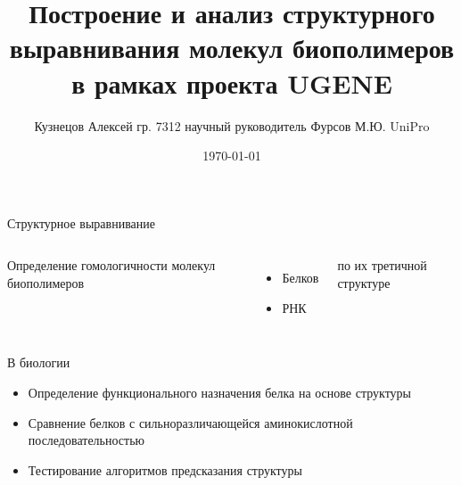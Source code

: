 \documentclass[utf8]{beamer}
\title[Построение структурного выравнивания]{Построение и анализ структурного выравнивания молекул биополимеров в рамках проекта UGENE}
\author[Кузнецов Алексей]{Кузнецов Алексей гр. 7312 \linebreak научный руководитель Фурсов М.Ю. UniPro}
\institute{Новосибирский Государственный Университет}
\date{\today}
\begin{document}

\begin{frame}
\titlepage
\end{frame}

\begin{frame}{Структурное выравнивание}
\begin{columns}[c]
	Определение гомологичности молекул биополимеров
	\begin{itemize}
		\item Белков
		\item РНК
	\end{itemize}
	по их третичной структуре

\end{columns}


\end{frame}

\begin{frame}{В биологии}
\begin{itemize}
	\item Определение функционального назначения белка на основе структуры
	\item Сравнение белков с сильноразличающейся аминокислотной последовательностью
	\item Тестирование алгоритмов предсказания структуры
\end{itemize}
\end{frame}
\end{document}
